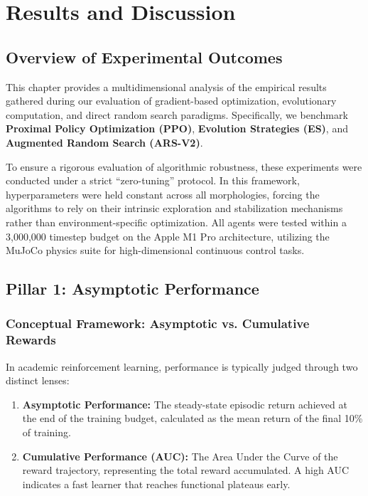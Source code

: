 %
%
\chapter{Results and Discussion}
\label{chap:results}
\setlength{\parskip}{1em}
%

\section{Overview of Experimental Outcomes}
This chapter provides a multidimensional analysis of the empirical results gathered during our evaluation of gradient-based optimization, evolutionary computation, and direct random search paradigms. Specifically, we benchmark \textbf{Proximal Policy Optimization (PPO)}, \textbf{Evolution Strategies (ES)}, and \textbf{Augmented Random Search (ARS-V2)}. 

To ensure a rigorous evaluation of algorithmic robustness, these experiments were conducted under a strict ``zero-tuning'' protocol. In this framework, hyperparameters were held constant across all morphologies, forcing the algorithms to rely on their intrinsic exploration and stabilization mechanisms rather than environment-specific optimization. All agents were tested within a 3,000,000 timestep budget on the Apple M1 Pro architecture, utilizing the MuJoCo physics suite for high-dimensional continuous control tasks.


\section{Pillar 1: Asymptotic Performance}

\subsection{Conceptual Framework: Asymptotic vs. Cumulative Rewards}
In academic reinforcement learning, performance is typically judged through two distinct lenses:
\begin{enumerate}
    \item \textbf{Asymptotic Performance:} The steady-state episodic return achieved at the end of the training budget, calculated as the mean return of the final 10\% of training.
    \item \textbf{Cumulative Performance (AUC):} The Area Under the Curve of the reward trajectory, representing the total reward accumulated. A high AUC indicates a fast learner that reaches functional plateaus early.
\end{enumerate}

